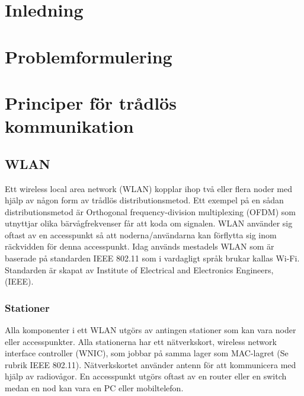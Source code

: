 \documentclass[a4paper,12pt,fleqn]{article}
\begin{document}
\addto\captionsswedish{\renewcommand{\contentsname}{Innehållsförteckning}}

\tableofcontents
\thispagestyle{fancy}
\newpage

\section{Inledning}
\section{Problemformulering}
\section{Principer för trådlös kommunikation}
\subsection{WLAN}
Ett wireless local area network (WLAN) kopplar ihop två eller flera noder med hjälp av någon form av trådlös distributionsmetod. Ett exempel på en sådan distributionsmetod är Orthogonal frequency-division multiplexing (OFDM) som utnyttjar olika bärvågfrekvenser får att koda om signalen. WLAN använder sig oftast av en accesspunkt så att noderna/användarna kan förflytta sig inom räckvidden för denna accesspunkt. Idag används mestadels WLAN som är baserade på standarden IEEE 802.11 som i vardagligt språk brukar kallas Wi-Fi. Standarden är skapat av Institute of Electrical and Electronics Engineers, (IEEE).

\subsubsection{Stationer}
Alla komponenter i ett WLAN utgörs av antingen stationer som kan vara noder eller accesspunkter. Alla stationerna har ett nätverkskort, wireless network interface controller (WNIC), som jobbar på samma lager som MAC-lagret (Se rubrik IEEE 802.11). Nätverkskortet använder antenn för att kommunicera med hjälp av radiovågor. En accesspunkt utgörs oftast av en router eller en switch medan en nod kan vara en PC eller mobiltelefon.
\end{document}
